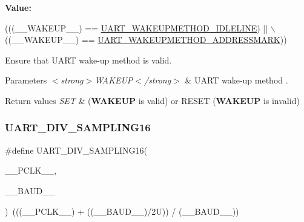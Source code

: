 {\bfseries Value\+:}
\begin{DoxyCode}
(((\_\_WAKEUP\_\_) == \hyperlink{group___u_a_r_t___wake_up___methods_ga2411ed44c5d82db84c5819e1e2b5b8b3}{UART\_WAKEUPMETHOD\_IDLELINE}) || \(\backslash\)
                                          ((\_\_WAKEUP\_\_) == 
      \hyperlink{group___u_a_r_t___wake_up___methods_ga4c6935f26f8f2a9fe70fd6306a9882cb}{UART\_WAKEUPMETHOD\_ADDRESSMARK}))
\end{DoxyCode}


Ensure that U\+A\+RT wake-\/up method is valid. 


\begin{DoxyParams}{Parameters}
{\em $<$strong$>$\+W\+A\+K\+E\+U\+P$<$/strong$>$} & U\+A\+RT wake-\/up method . \\
\hline
\end{DoxyParams}

\begin{DoxyRetVals}{Return values}
{\em S\+ET} & ({\bfseries W\+A\+K\+E\+UP} is valid) or R\+E\+S\+ET ({\bfseries W\+A\+K\+E\+UP} is invalid) \\
\hline
\end{DoxyRetVals}
\mbox{\label{group___u_a_r_t___private___macros_gac2423ff86559eb91198bcc438caec865}} 
\subsubsection{\texorpdfstring{U\+A\+R\+T\+\_\+\+D\+I\+V\+\_\+\+S\+A\+M\+P\+L\+I\+N\+G16}{UART\_DIV\_SAMPLING16}}
{\footnotesize\ttfamily \#define U\+A\+R\+T\+\_\+\+D\+I\+V\+\_\+\+S\+A\+M\+P\+L\+I\+N\+G16(\begin{DoxyParamCaption}\item[{}]{\+\_\+\+\_\+\+P\+C\+L\+K\+\_\+\+\_\+,  }\item[{}]{\+\_\+\+\_\+\+B\+A\+U\+D\+\_\+\+\_\+ }\end{DoxyParamCaption})~(((\+\_\+\+\_\+\+P\+C\+L\+K\+\_\+\+\_\+) + ((\+\_\+\+\_\+\+B\+A\+U\+D\+\_\+\+\_\+)/2\+U)) / (\+\_\+\+\_\+\+B\+A\+U\+D\+\_\+\+\_\+))}



